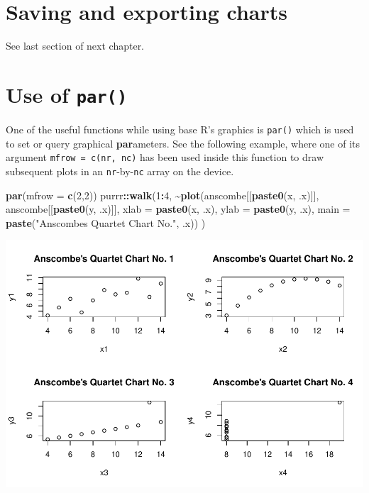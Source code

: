 \documentclass[
]{book}
\newenvironment{Shaded}{\begin{snugshade}}{\end{snugshade}}
\newcommand{\AttributeTok}[1]{\textcolor[rgb]{0.13,0.29,0.53}{#1}}
\newcommand{\DecValTok}[1]{\textcolor[rgb]{0.00,0.00,0.81}{#1}}
\newcommand{\FunctionTok}[1]{\textcolor[rgb]{0.13,0.29,0.53}{\textbf{#1}}}
\newcommand{\NormalTok}[1]{#1}
\newcommand{\SpecialCharTok}[1]{\textcolor[rgb]{0.81,0.36,0.00}{\textbf{#1}}}
\newcommand{\StringTok}[1]{\textcolor[rgb]{0.31,0.60,0.02}{#1}}
\begin{document}
\hypertarget{saving-and-exporting-charts}{%
\section{Saving and exporting charts}\label{saving-and-exporting-charts}}

See last section of next chapter.

\hypertarget{use-of-par}{%
\section{\texorpdfstring{Use of \texttt{par()}}{Use of par()}}\label{use-of-par}}

One of the useful functions while using base R's graphics is \texttt{par()} which is used to set or query graphical \textbf{par}ameters. See the following example, where one of its argument \texttt{mfrow\ =\ c(nr,\ nc)} has been used inside this function to draw subsequent plots in an \texttt{nr}-by-\texttt{nc} array on the device.

\begin{Shaded}
\begin{Highlighting}[]
\FunctionTok{par}\NormalTok{(}\AttributeTok{mfrow =} \FunctionTok{c}\NormalTok{(}\DecValTok{2}\NormalTok{,}\DecValTok{2}\NormalTok{))}
\NormalTok{purrr}\SpecialCharTok{::}\FunctionTok{walk}\NormalTok{(}\DecValTok{1}\SpecialCharTok{:}\DecValTok{4}\NormalTok{, }
     \SpecialCharTok{\textasciitilde{}}\FunctionTok{plot}\NormalTok{(anscombe[[}\FunctionTok{paste0}\NormalTok{(}\StringTok{\textquotesingle{}x\textquotesingle{}}\NormalTok{, .x)]], }
\NormalTok{           anscombe[[}\FunctionTok{paste0}\NormalTok{(}\StringTok{\textquotesingle{}y\textquotesingle{}}\NormalTok{, .x)]], }
           \AttributeTok{xlab =} \FunctionTok{paste0}\NormalTok{(}\StringTok{\textquotesingle{}x\textquotesingle{}}\NormalTok{, .x),}
           \AttributeTok{ylab =} \FunctionTok{paste0}\NormalTok{(}\StringTok{\textquotesingle{}y\textquotesingle{}}\NormalTok{, .x),}
           \AttributeTok{main =} \FunctionTok{paste}\NormalTok{(}\StringTok{"Anscombe\textquotesingle{}s Quartet Chart No."}\NormalTok{, .x))}
\NormalTok{     )}
\end{Highlighting}
\end{Shaded}

\includegraphics{DauR_files/figure-latex/unnamed-chunk-206-1.pdf}
\end{document}
